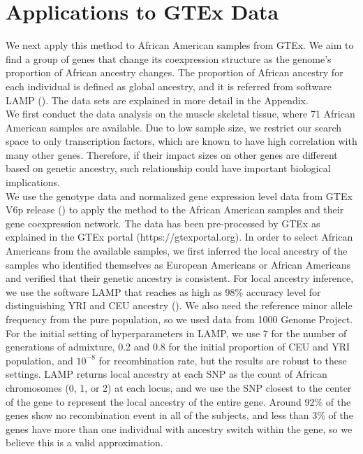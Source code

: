 \documentclass[aap,authoryear, preprint]{imsart}
\numberwithin{equation}{section}
\theoremstyle{plain}
\begin{document}
\section{Applications to GTEx Data} \label{sec:applications}
We next apply this method to African American samples from GTEx. We aim to find a group of genes that change its coexpression structure as the genome's proportion of African ancestry changes. The proportion of African ancestry for each individual is defined as global ancestry, and it is referred from software LAMP (\cite{pacsaniuc2009imputation}). The data sets are explained in more detail in the Appendix.\\

We first conduct the data analysis on the muscle skeletal tissue, where 71 African American samples are available. Due to low sample size, we restrict our search space to only transcription factors, which are known to have high correlation with many other genes. Therefore, if their impact sizes on other genes are different based on genetic ancestry, such relationship could have important biological implications. \\

We use the genotype data and normalized gene expression level data from GTEx V6p release (\cite{lonsdale2013genotype}) to apply the method to the African American samples and their gene coexpression network. The data has been pre-processed by GTEx as explained in the GTEx portal (https://gtexportal.org). In order to select African Americans from the available samples, we first inferred the local ancestry of the samples who identified themselves as European Americans or African Americans and verified that their genetic ancestry is consistent. For local ancestry inference, we use the software LAMP that reaches as high as 98\% accuracy level for distinguishing YRI and CEU ancestry (\cite{pacsaniuc2009imputation}). We also need the reference minor allele frequency from the pure population, so we used data from 1000 Genome Project. For the initial setting of hyperparameters in LAMP, we use 7 for the number of generations of admixture, 0.2 and 0.8 for the initial proportion of CEU and YRI population, and $10^{-8}$ for recombination rate, but the results are robust to these settings. LAMP returns local ancestry at each SNP as the count of African chromosomes (0, 1, or 2) at each locus, and we use the SNP closest to the center of the gene to represent the local ancestry of the entire gene.  Around 92\% of the genes show no recombination event in all of the subjects, and less than 3\% of the genes have more than one individual with ancestry switch within the gene, so we believe this is a valid approximation. \\
\end{document}
